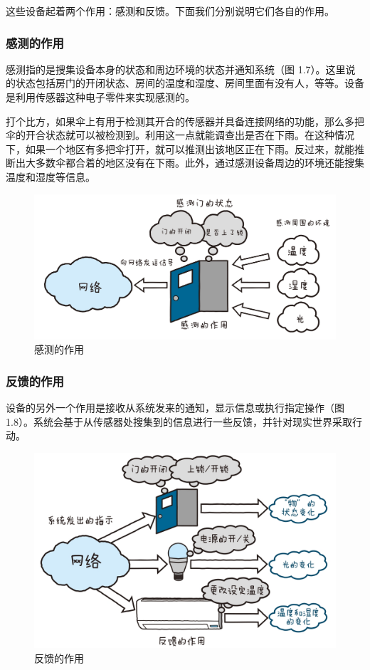\documentclass[12pt,UTF8]{ctexbook}
\begin{document}
这些设备起着两个作用：感测和反馈。下面我们分别说明它们各自的作用。

\subsubsection{感测的作用}

感测指的是搜集设备本身的状态和周边环境的状态并通知系统（图 1.7）。这里说的状态包括房门的开闭状态、房间的温度和湿度、房间里面有没有人，等等。设备是利用传感器这种电子零件来实现感测的。

打个比方，如果伞上有用于检测其开合的传感器并具备连接网络的功能，那么多把伞的开合状态就可以被检测到。利用这一点就能调查出是否在下雨。在这种情况下，如果一个地区有多把伞打开，就可以推测出该地区正在下雨。反过来，就能推断出大多数伞都合着的地区没有在下雨。此外，通过感测设备周边的环境还能搜集温度和湿度等信息。

\begin{figure}[htbp]
	\centering
	\includegraphics[width=1\linewidth]{7}
	\caption{感测的作用}
	\label{fig:1}
\end{figure}

\subsubsection{反馈的作用}

设备的另外一个作用是接收从系统发来的通知，显示信息或执行指定操作（图 1.8）。系统会基于从传感器处搜集到的信息进行一些反馈，并针对现实世界采取行动。

\begin{figure}[htbp]
	\centering
	\includegraphics[width=1\linewidth]{8}
	\caption{反馈的作用}
	\label{fig:1}
\end{figure}
\end{document}
